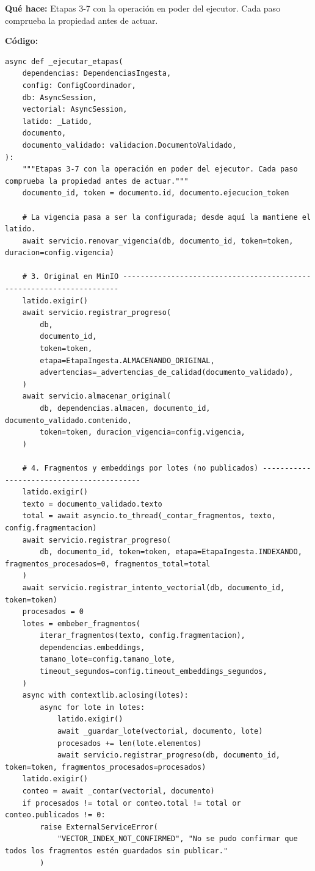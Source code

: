 \documentclass[11pt,a4paper]{article}
\begin{document}
\textbf{Qué hace:} Etapas 3-7 con la operación en poder del ejecutor. Cada paso comprueba la propiedad antes de actuar.

\textbf{Código:}
\begin{lstlisting}
async def _ejecutar_etapas(
    dependencias: DependenciasIngesta,
    config: ConfigCoordinador,
    db: AsyncSession,
    vectorial: AsyncSession,
    latido: _Latido,
    documento,
    documento_validado: validacion.DocumentoValidado,
):
    """Etapas 3-7 con la operación en poder del ejecutor. Cada paso comprueba la propiedad antes de actuar."""
    documento_id, token = documento.id, documento.ejecucion_token

    # La vigencia pasa a ser la configurada; desde aquí la mantiene el latido.
    await servicio.renovar_vigencia(db, documento_id, token=token, duracion=config.vigencia)

    # 3. Original en MinIO ---------------------------------------------------------------------
    latido.exigir()
    await servicio.registrar_progreso(
        db,
        documento_id,
        token=token,
        etapa=EtapaIngesta.ALMACENANDO_ORIGINAL,
        advertencias=_advertencias_de_calidad(documento_validado),
    )
    await servicio.almacenar_original(
        db, dependencias.almacen, documento_id, documento_validado.contenido,
        token=token, duracion_vigencia=config.vigencia,
    )

    # 4. Fragmentos y embeddings por lotes (no publicados) ------------------------------------------
    latido.exigir()
    texto = documento_validado.texto
    total = await asyncio.to_thread(_contar_fragmentos, texto, config.fragmentacion)
    await servicio.registrar_progreso(
        db, documento_id, token=token, etapa=EtapaIngesta.INDEXANDO, fragmentos_procesados=0, fragmentos_total=total
    )
    await servicio.registrar_intento_vectorial(db, documento_id, token=token)
    procesados = 0
    lotes = embeber_fragmentos(
        iterar_fragmentos(texto, config.fragmentacion),
        dependencias.embeddings,
        tamano_lote=config.tamano_lote,
        timeout_segundos=config.timeout_embeddings_segundos,
    )
    async with contextlib.aclosing(lotes):
        async for lote in lotes:
            latido.exigir()
            await _guardar_lote(vectorial, documento, lote)
            procesados += len(lote.elementos)
            await servicio.registrar_progreso(db, documento_id, token=token, fragmentos_procesados=procesados)
    latido.exigir()
    conteo = await _contar(vectorial, documento)
    if procesados != total or conteo.total != total or conteo.publicados != 0:
        raise ExternalServiceError(
            "VECTOR_INDEX_NOT_CONFIRMED", "No se pudo confirmar que todos los fragmentos estén guardados sin publicar."
        )


\end{lstlisting}
\end{document}
